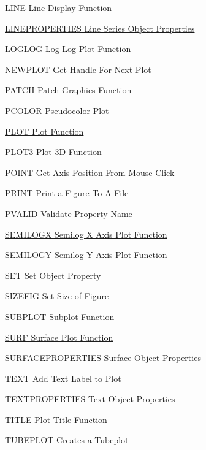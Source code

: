 \begin{DoxyItemize}
\item \hyperlink{handle_line}{L\-I\-N\-E Line Display Function}  
\item \hyperlink{handle_lineproperties}{L\-I\-N\-E\-P\-R\-O\-P\-E\-R\-T\-I\-E\-S Line Series Object Properties}  
\item \hyperlink{handle_loglog}{L\-O\-G\-L\-O\-G Log-\/\-Log Plot Function}  
\item \hyperlink{handle_newplot}{N\-E\-W\-P\-L\-O\-T Get Handle For Next Plot}  
\item \hyperlink{handle_patch}{P\-A\-T\-C\-H Patch Graphics Function}  
\item \hyperlink{handle_pcolor}{P\-C\-O\-L\-O\-R Pseudocolor Plot}  
\item \hyperlink{handle_plot}{P\-L\-O\-T Plot Function}  
\item \hyperlink{handle_plot3}{P\-L\-O\-T3 Plot 3\-D Function}  
\item \hyperlink{handle_point}{P\-O\-I\-N\-T Get Axis Position From Mouse Click}  
\item \hyperlink{handle_print}{P\-R\-I\-N\-T Print a Figure To A File}  
\item \hyperlink{handle_pvalid}{P\-V\-A\-L\-I\-D Validate Property Name}  
\item \hyperlink{handle_semilogx}{S\-E\-M\-I\-L\-O\-G\-X Semilog X Axis Plot Function}  
\item \hyperlink{handle_semilogy}{S\-E\-M\-I\-L\-O\-G\-Y Semilog Y Axis Plot Function}  
\item \hyperlink{handle_set}{S\-E\-T Set Object Property}  
\item \hyperlink{handle_sizefig}{S\-I\-Z\-E\-F\-I\-G Set Size of Figure}  
\item \hyperlink{handle_subplot}{S\-U\-B\-P\-L\-O\-T Subplot Function}  
\item \hyperlink{handle_surf}{S\-U\-R\-F Surface Plot Function}  
\item \hyperlink{handle_surfaceproperties}{S\-U\-R\-F\-A\-C\-E\-P\-R\-O\-P\-E\-R\-T\-I\-E\-S Surface Object Properties}  
\item \hyperlink{handle_text}{T\-E\-X\-T Add Text Label to Plot}  
\item \hyperlink{handle_textproperties}{T\-E\-X\-T\-P\-R\-O\-P\-E\-R\-T\-I\-E\-S Text Object Properties}  
\item \hyperlink{handle_title}{T\-I\-T\-L\-E Plot Title Function}  
\item \hyperlink{handle_tubeplot}{T\-U\-B\-E\-P\-L\-O\-T Creates a Tubeplot}  

\end{DoxyItemize}
